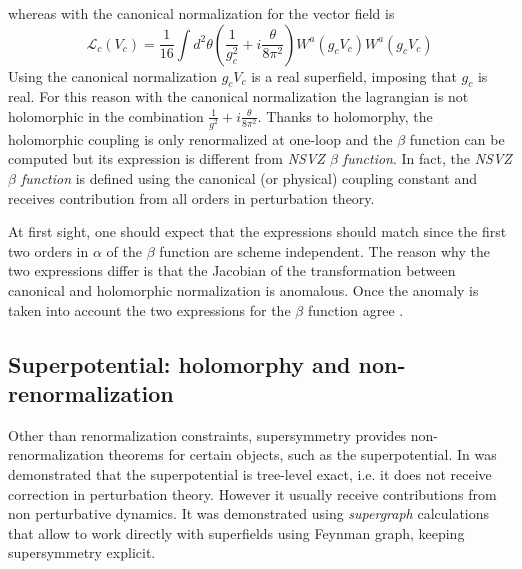 whereas with the canonical normalization for the vector field is
\begin{equation}
 \mathcal{L}_c ( V_c) = \frac{1}{16} \int d^2 \theta \left( \frac{1}{g_c^2}  +i \frac{\theta}{8 \pi^2} \right) W^a ( g_c V_c) W^a(g_c V_c) 
\end{equation}
Using the canonical normalization $g_c V_c$ is a real superfield, imposing that $g_c$ is real. For this reason with the canonical normalization the lagrangian is not holomorphic in the combination $ \frac{1}{g^2 } + i \frac{\theta}{8 \pi^2} $.
Thanks to holomorphy, the holomorphic coupling is only renormalized at one-loop and the $\beta$ function can be computed but its expression is different from \emph{NSVZ $\beta$ function}.
In fact, the \emph{NSVZ $\beta$ function} is defined using the canonical (or physical) coupling constant and receives contribution from all orders in perturbation theory.

At first sight, one should expect that the expressions should match since the first two orders in $\alpha$ of the $\beta$ function are scheme independent. 
The reason why the two expressions differ is that the Jacobian of the transformation between canonical and holomorphic normalization is anomalous. 
Once the anomaly is taken into account the two expressions for the $\beta$ function agree \cite{ArkaniHamed:1997mj}.


\subsection{Superpotential: holomorphy and non-renormalization}
Other than renormalization constraints, supersymmetry provides non-renormalization theorems for certain objects, such as the superpotential.
In \cite{Grisaru:1979wc} was demonstrated that the superpotential is tree-level exact, i.e. it does not receive correction in perturbation theory. 
However it usually receive contributions from non perturbative dynamics.
It was demonstrated using \emph{supergraph} calculations that allow to work directly with superfields using Feynman graph, keeping supersymmetry explicit. 

